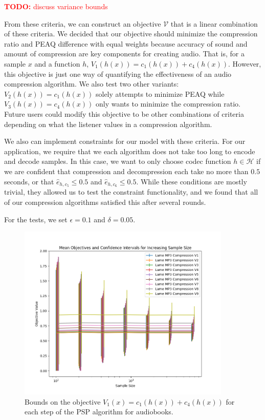 \documentclass{article}
\newcommand\todo[1]{\textcolor{red}{\textbf{TODO:} #1}}
\begin{document}
{\todo{discuss variance bounds}

From these criteria, we can construct an objective $\mathcal{V}$ that is a linear combination of these criteria. We decided that our objective should minimize the compression ratio and PEAQ difference with equal weights because accuracy of sound and amount of compression are key components for creating audio. That is, for a sample $x$ and a function $h$, $V_1(h(x)) = c_1(h(x)) + c_4(h(x))$. However, this objective is just one way of quantifying the effectiveness of an audio compression algorithm. We also test two other variants: $V_2(h(x)) = c_1(h(x))$ solely attempts to minimize PEAQ while $V_3(h(x)) = c_4(h(x))$ only wants to minimize the compression ratio. Future users could modify this objective to be other combinations of criteria depending on what the listener values in a compression algorithm.

We also can implement constraints for our model with these criteria. For our application, we require that we each algorithm does not take too long to encode and decode samples. In this case, we want to only choose codec function $h \in \mathcal{H}$ if we are confident that compression and decompression each take no more than $0.5$ seconds, or that $\hat{e}_{h,c_5} \leq 0.5$ and $\hat{e}_{h,c_6} \leq 0.5$. While these conditions are mostly trivial, they allowed us to test the constraint functionality, and we found that all of our compression algorithms satisfied this after several rounds.

For the tests, we set $\epsilon = 0.1$ and $\delta = 0.05$.

\begin{figure}
	\centering
	\includegraphics[width=4in]{codec_figures/obj1plot_py.png}
	\caption{Bounds on the objective $V_1(x) =   c_1(h(x)) + c_4(h(x))$ for each step of the PSP algorithm for audiobooks.}
	\label{obj1plot}
\end{figure}

}
\end{document}
